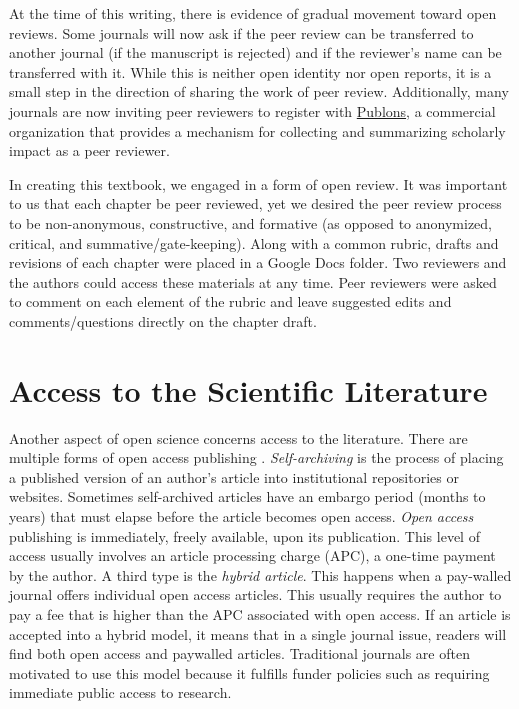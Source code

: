 \documentclass[
  11pt,
]{book}
\begin{document}
At the time of this writing, there is evidence of gradual movement toward open reviews. Some journals will now ask if the peer review can be transferred to another journal (if the manuscript is rejected) and if the reviewer's name can be transferred with it. While this is neither open identity nor open reports, it is a small step in the direction of sharing the work of peer review. Additionally, many journals are now inviting peer reviewers to register with \href{https://publons.com/wos-op/about/home/}{Publons}, a commercial organization that provides a mechanism for collecting and summarizing scholarly impact as a peer reviewer.

In creating this textbook, we engaged in a form of open review. It was important to us that each chapter be peer reviewed, yet we desired the peer review process to be non-anonymous, constructive, and formative (as opposed to anonymized, critical, and summative/gate-keeping). Along with a common rubric, drafts and revisions of each chapter were placed in a Google Docs folder. Two reviewers and the authors could access these materials at any time. Peer reviewers were asked to comment on each element of the rubric and leave suggested edits and comments/questions directly on the chapter draft.

\section{Access to the Scientific Literature}\label{access-to-the-scientific-literature}

Another aspect of open science concerns access to the literature. There are multiple forms of open access publishing \citep{bezjak_open_2018, shah_open_2017}. \emph{Self-archiving} is the process of placing a published version of an author's article into institutional repositories or websites. Sometimes self-archived articles have an embargo period (months to years) that must elapse before the article becomes open access. \emph{Open access} publishing is immediately, freely available, upon its publication. This level of access usually involves an article processing charge (APC), a one-time payment by the author. A third type is the \emph{hybrid article}. This happens when a pay-walled journal offers individual open access articles. This usually requires the author to pay a fee that is higher than the APC associated with open access. If an article is accepted into a hybrid model, it means that in a single journal issue, readers will find both open access and paywalled articles. Traditional journals are often motivated to use this model because it fulfills funder policies such as requiring immediate public access to research.
\end{document}
